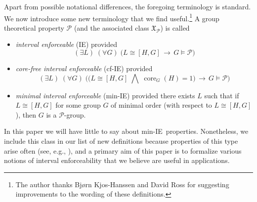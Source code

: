 \documentclass[11pt]{amsart}
\theoremstyle{plain}
\theoremstyle{definition}
\theoremstyle{remark}
\numberwithin{theorem}{section}
\numberwithin{claim}{section}
\numberwithin{equation}{section}
\numberwithin{conjecture}{section}
\newcommand{\<}{\ensuremath{\langle}}
\renewcommand{\>}{\ensuremath{\rangle}}
\newcommand{\Meet}{\ensuremath{\bigwedge}}
\newcommand{\core}{\ensuremath{\operatorname{core}}}
\newcommand{\0}{\ensuremath{\mathbf{0}}}
\newcommand{\1}{\ensuremath{\mathbf{1}}}
\newcommand{\2}{\ensuremath{\mathbf{2}}}
\newcommand{\3}{\ensuremath{\mathbf{3}}}
\newcommand{\4}{\ensuremath{\mathbf{4}}}
\newcommand{\5}{\ensuremath{\mathbf{5}}}
\newcommand{\sG}{\ensuremath{\mathfrak{X}}}
\newcommand{\cP}{\ensuremath{\mathcal{P}}}
\newcommand{\IE}{{\small IE}}
\begin{document}
Apart from possible notational differences, the foregoing terminology is
standard.  We now introduce some new terminology that we find
useful.\footnote{The author thanks Bj{\o}rn Kjos-Hanssen and David Ross for suggesting
  improvements to the wording of these definitions.}
A group theoretical property $\cP$  (and the associated class $\sG_\cP$) is called 
\begin{itemize}
\item 
\emph{interval enforceable} (\IE) provided
\[
(\exists L)  \; (\forall G) \; \bigl(L\cong [H,G] \, \longrightarrow \, G \vDash \cP\bigr)
\]
\item
\emph{core-free interval enforceable} (cf-\IE) provided
\[
(\exists L)  \; (\forall G) \; \bigl(\bigl(L\cong [H,G] \; \Meet \; \core_G(H)=1\bigr)
\, \longrightarrow \, G  \vDash \cP\bigr)
\]
\item 
\emph{minimal interval enforceable} (min-\IE)
provided there exists $L$ such that if $L\cong [H,G]$ for some group $G$ of
minimal order (with respect to $L\cong [H,G]$), then
$G$ is a $\cP$-group.   
\end{itemize}
In this paper we will have little to
say about min-\IE\ properties.  Nonetheless, we include this class in our list
of new definitions because properties of this type arise often (see, e.g.,
\cite{Lucchini:1994a}), and a primary aim of this paper is to formalize
various notions of interval enforceability that we believe are
useful in applications. 
\end{document}
